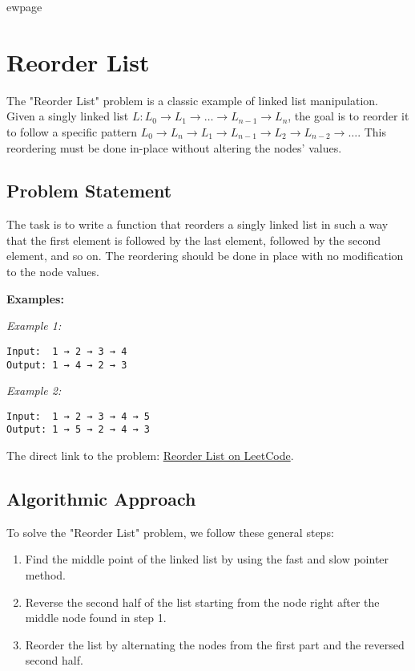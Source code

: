 
ewpage
\chapter{Reorder List}
\label{chap:Reorder_List}

The "Reorder List" problem is a classic example of linked list manipulation. Given a singly linked list \( L: L_0 \rightarrow L_1 \rightarrow \dots \rightarrow L_{n-1} \rightarrow L_n \), the goal is to reorder it to follow a specific pattern \( L_0 \rightarrow L_n \rightarrow L_1 \rightarrow L_{n-1} \rightarrow L_2 \rightarrow L_{n-2} \rightarrow \dots \). This reordering must be done in-place without altering the nodes' values.

\section*{Problem Statement}
The task is to write a function that reorders a singly linked list in such a way that the first element is followed by the last element, followed by the second element, and so on. The reordering should be done in place with no modification to the node values.

\textbf{Examples:}

\textit{Example 1:}
\begin{verbatim}
Input:  1 → 2 → 3 → 4
Output: 1 → 4 → 2 → 3
\end{verbatim}

\textit{Example 2:}
\begin{verbatim}
Input:  1 → 2 → 3 → 4 → 5
Output: 1 → 5 → 2 → 4 → 3
\end{verbatim}

The direct link to the problem: \href{https://leetcode.com/problems/reorder-list/}{Reorder List on LeetCode}.

\section*{Algorithmic Approach}
To solve the "Reorder List" problem, we follow these general steps:

\begin{enumerate}
    \item Find the middle point of the linked list by using the fast and slow pointer method.
    \item Reverse the second half of the list starting from the node right after the middle node found in step 1.
    \item Reorder the list by alternating the nodes from the first part and the reversed second half.
\end{enumerate}


